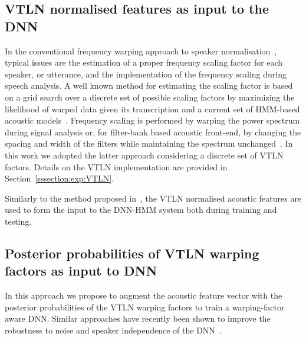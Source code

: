 \documentclass{nle}
\begin{document}
\subsection{VTLN normalised features as input to the DNN}
In   the   conventional   frequency   warping  approach   to   speaker
normalisation~\citep{EidGis96,LeeRos96,WegMcaOrlPek96},  typical issues
are  the estimation  of a  proper  frequency scaling  factor for  each
speaker, or utterance, and the implementation of the frequency scaling
during  speech  analysis.  A  well  known  method  for estimating  the
scaling  factor is  based on  a  grid search  over a  discrete set  of
possible scaling  factors by maximizing the likelihood  of warped data
given  its transcription and a  current set  of  HMM-based acoustic  models~\citep{LeeRos96}.
Frequency scaling  is performed by  warping the power  spectrum during
signal  analysis  or, for  filter-bank  based  acoustic front-end,  by
changing the  spacing and width  of the filters while  maintaining the
spectrum  unchanged~\citep{LeeRos96}.   In  this  work we  adopted  the
latter approach considering a discrete set of VTLN factors. Details on the VTLN implementation  are provided in
Section~\ref{sssection:exp:VTLN}.

Similarly to the method proposed in~\citet{seide11}, the VTLN normalised
acoustic features are used to form the input to the DNN-HMM system both
during training and testing.

\subsection{Posterior probabilities of VTLN warping factors as input to DNN}
In this  approach we propose  to augment the acoustic  feature vector
with the posterior probabilities of  the VTLN warping factors to train
a warping-factor  aware DNN.   Similar approaches have  recently been
shown  to  improve the  robustness  to noise and  speaker  independence of  the
DNN~\citep{export:194344,42536}.
\end{document}
